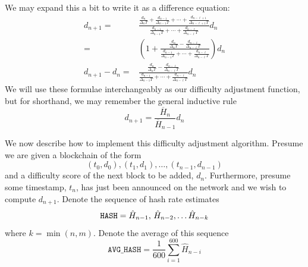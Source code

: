 \documentclass[12pt,english]{mrl}
\theoremstyle{definition}
\numberwithin{equation}{section}
\numberwithin{figure}{section}
\numberwithin{equation}{section}
\numberwithin{equation}{section}
\numberwithin{figure}{section}
\begin{document}
We may expand this a bit to write it as a difference equation:
\begin{align*}
d_{n+1}=& \frac{\frac{d_{n}}{\Delta_n T} + \frac{d_{n-1}}{\Delta_{n-1} T} + \cdots +  \frac{d_{n-\ell + 1}}{\Delta_{n-\ell + 1} T}}{\frac{d_{n-1}}{\Delta_{n-1} T} + \cdots +  \frac{d_{n-\ell }}{\Delta_{n-\ell } T}}d_n\\
=& \left(1 + \frac{\frac{d_n}{\Delta_n T} - \frac{d_{n-\ell}}{\Delta_{n-\ell} T}}{\frac{d_{n-1}}{\Delta_{n-1} T} + \cdots +  \frac{d_{n-\ell }}{\Delta_{n-\ell } T}} \right) d_n\\
d_{n+1} - d_n =& \frac{\frac{d_n}{\Delta_n T} - \frac{d_{n-\ell}}{\Delta_{n-\ell} T}}{\frac{d_{n-1}}{\Delta_{n-1} T} + \cdots +  \frac{d_{n-\ell }}{\Delta_{n-\ell } T}} d_n
\end{align*}
We will use these formulae interchangeably as our difficulty adjustment function, but for shorthand, we may remember the general inductive rule
\[d_{n+1}= \frac{\overline{H}_n}{\overline{H}_{n-1}} d_{n}\]

We now describe how to implement this difficulty adjustment algorithm. Presume we are given a blockchain of the form
\[(t_0, d_0), (t_1, d_1), \ldots, (t_{n-1}, d_{n-1})\]
and a difficulty score of the next block to be added, $d_n$. Furthermore, presume some timestamp, $t_n$, has just been announced on the network and we wish to compute $d_{n+1}$. Denote the sequence of hash rate estimates
\[\texttt{HASH} = \hat{H}_{n-1}$, $\hat{H}_{n-2}, \ldots \hat{H}_{n-k}\]
where $k = \min(n,m)$. Denote the average of this sequence
\[\texttt{AVG\_HASH} = \frac{1}{600} \sum_{i=1}^{600} \hat{H}_{n-i}\]
\end{document}
